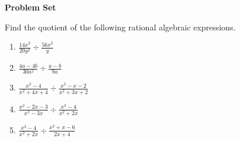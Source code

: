 \textbf{Problem Set}

\vspce

Find the quotient of the following rational algebraic expressions. 

\vspce

\begin{enumerate}[label = \arabic*. ]

\item \hspce $\displaystyle \frac{14x^2}{20y^2} \div \frac{56x^2}{y}$ 
\item \hspce $\displaystyle \frac{4a-4b}{30a^2} \div \frac{a-b}{9a}$ 
\item \hspce $\displaystyle \frac{x^2-4}{x^2+4x+4} \div \frac{x^2-x-2}{x^2+3x+2}$
\item \hspce $\displaystyle \frac{x^2-2x-3}{x^{2}-3x} \div \frac{x^2-4}{x^{2}+2x}$
\item \hspce $\displaystyle \frac{x^2-4}{x^2+2x} \div \frac{x^2+x-6}{2x+4}$

\end{enumerate}